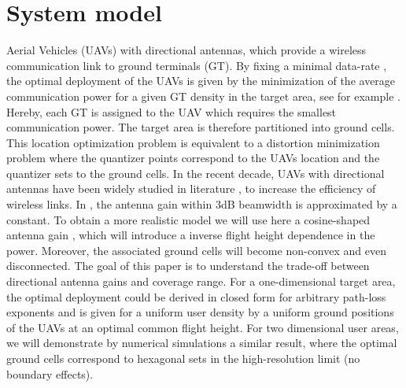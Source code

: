 \documentclass[smallabstract,smallcaptions]{dccpaper}
\newcounter{example}[section]
\newcommand{\philippstart}{\color{black}}
\newcommand{\philippend}{\color{black}}
\begin{document}
\section{System model}\label{sec:model}
%
\philippstart
Aerial Vehicles (UAVs) with directional antennas, which provide a wireless communication link to ground terminals (GT).
By fixing a minimal data-rate , the optimal deployment of the UAVs is given by the minimization of the average
communication power for a given GT density in the target area, see for example \cite{Erdem}. Hereby, each GT is assigned
to the UAV which requires the smallest communication power.  The target area is therefore partitioned into ground cells.
This location optimization problem is equivalent to a distortion minimization problem where the quantizer points
correspond to the UAVs location and the quantizer sets to the ground cells.  In the recent decade, UAVs with directional
antennas have been widely studied in literature \cite{BJL,MSF,HA,KMR,HSYR,MWMM}, to increase the efficiency of wireless
links.   In \cite{BJL,MSF,HA,KMR,HSYR,MWMM}, the antenna gain within 3dB beamwidth is approximated by a constant. To
obtain a more realistic model we will use here a cosine-shaped antenna gain \cite{CAB2}, which will introduce a inverse
flight height dependence in the power.  Moreover, the associated ground cells will become non-convex and even
disconnected.  The goal of this paper is to understand the trade-off between directional antenna gains and coverage
range. For a one-dimensional target area, the optimal deployment could be derived in closed form for arbitrary path-loss
exponents and is given for a uniform user density by a uniform ground positions of the UAVs at an optimal common flight
height. For two dimensional user areas, we will demonstrate by numerical simulations a similar result, where the optimal
ground cells correspond to hexagonal sets in the high-resolution limit (no boundary effects). 
\philippend
\end{document}

